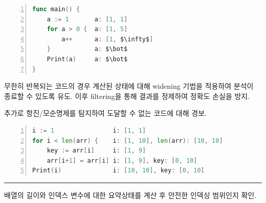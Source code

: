 \documentclass[%
    colorscheme=blue,   %
    fontsize=36pt,        %
    papersize=a0paper,    %
    paper=930mm:1000mm,
    orientation=portrait, %
    debug=false           %
]{betterposterv2}
\begin{document}
\begin{bpcolumns}[2]
    \begin{bpbox}[title={분석 예시: 무한 루프 및 Dead Code Detection}, bptitlebg=transparent]
        \noindent
        \begin{minipage}{0.5\textwidth}
            \begin{lstlisting}[language=Go, numbers=left, mathescape, xleftmargin=0.5cm]
func main() {
    a := 1       a: [1, 1]
    for a > 0 {  a: [1, 5]
        a++      a: [1, $\infty$]
    }            a: $\bot$
    Print(a)     a: $\bot$
}
            \end{lstlisting}
        \end{minipage}
        \vline \hfill
        \begin{minipage}{0.45\textwidth}
            \vspace{-0.7\baselineskip}
            무한히 반복되는 코드의 경우 계산된 상태에 대해 widening 기법을 적용하여 분석이 종료할 수 있도록 유도.
            이후 filtering을 통해 결과를 정제하여 정확도 손실을 방지. 
            
            추가로 항진/모순명제를 탐지하여 도달할 수 없는 코드에 대해 경보.
        \end{minipage}
    \end{bpbox}
    \begin{bpbox}[title={분석 예시: 배열 인덱싱 범위}, bptitlebg=transparent]
        \begin{lstlisting}[language=Go, numbers=left, mathescape, xleftmargin=0.5cm]
i := 1                i: [1, 1]
for i < len(arr) {    i: [1, 10], len(arr): [10, 10]
    key := arr[i]     i: [1, 9]
    arr[i+1] = arr[i] i: [1, 9], key: [0, 10]
Print(i)              i: [10, 10], key: [0, 10]
        \end{lstlisting}
        \hrule \kern15pt
        배열의 길이와 인덱스 변수에 대한 요약상태를 계산 후 안전한 인덱싱 범위인지 확인. 
    \end{bpbox}
\end{bpcolumns}

\end{document}
